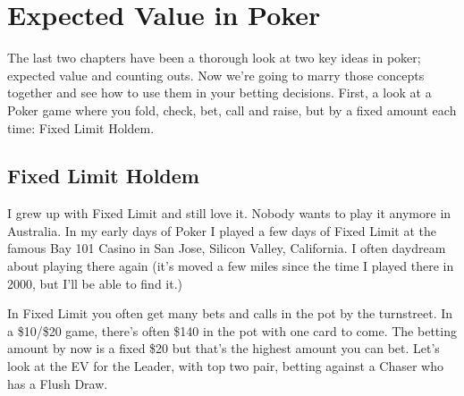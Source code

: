 \chapter{Expected Value in Poker}

The last two chapters have been a thorough look at two key ideas in
poker; expected value and counting outs. Now we're going to marry
those concepts together and see how to use them in your betting
decisions. First, a look at a Poker game where you fold, check, bet,
call and raise, but by a fixed amount each time: Fixed Limit Holdem.

\section{Fixed Limit Holdem}

I grew up with Fixed Limit and still love it. Nobody wants to play it
anymore in Australia. In my early days of Poker I played a few days of
Fixed Limit at the famous Bay 101 Casino in San Jose, Silicon Valley,
California. I often daydream about playing there again (it's moved a
few miles since the time I played there in 2000, but I'll be able to
find it.)

In Fixed Limit you often get many bets and calls in the pot by the
turnstreet. In a \$10/\$20 game, there's often \$140 in the pot with
one card to come. The betting amount by now is a fixed \$20 but that's
the highest amount you can bet. Let's look at the EV for the Leader,
with top two pair, betting against a Chaser who has a Flush Draw.

